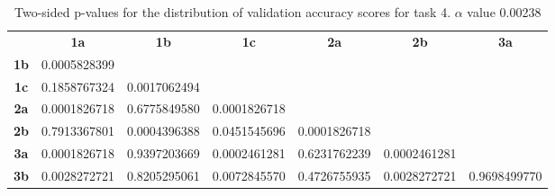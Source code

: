\begin{table}[h!]
    \centering
    \begin{tabular}{ccccccc}
                & \textbf{1a}        & \textbf{1b}        & \textbf{1c}        & \textbf{2a}        & \textbf{2b}        & \textbf{3a}  \\
    \textbf{1b} & 0.0005828399       &                    &                    &                    &                    &              \\
    \textbf{1c} & 0.1858767324       & 0.0017062494       &                    &                    &                    &              \\
    \textbf{2a} & 0.0001826718       & 0.6775849580       & 0.0001826718       &                    &                    &              \\
    \textbf{2b} & 0.7913367801       & 0.0004396388       & 0.0451545696       & 0.0001826718       &                    &              \\
    \textbf{3a} & 0.0001826718       & 0.9397203669       & 0.0002461281       & 0.6231762239       & 0.0002461281       &              \\
    \textbf{3b} & 0.0028272721       & 0.8205295061       & 0.0072845570       & 0.4726755935       & 0.0028272721       & 0.9698499770
    \end{tabular}
    \caption[p-table for validation accuracy (task 4)]{Two-sided p-values for the distribution of validation accuracy scores for task 4. \(\alpha\) value 0.00238}
    \label{tab:exp2.validation4}
\end{table}

\newpage